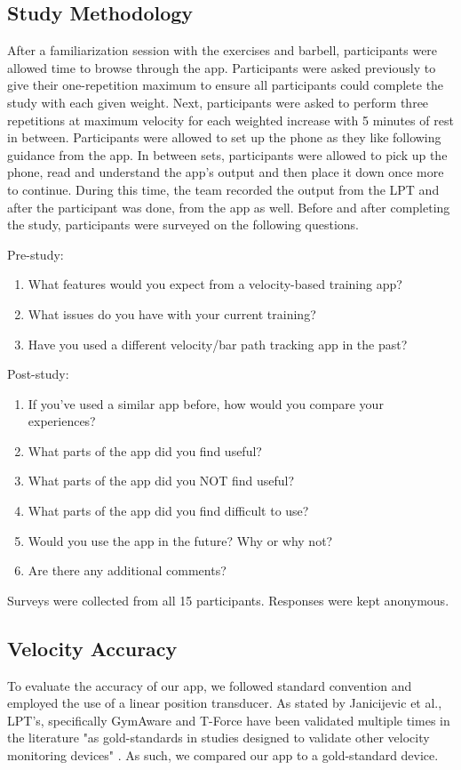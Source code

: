 \documentclass[10pt,twocolumn]{article}
\begin{document}
\subsection{Study Methodology}
After a familiarization session with the exercises and barbell, participants were allowed time to browse through the app.
Participants were asked previously to give their one-repetition maximum to ensure all participants could complete the study with each given weight.
Next, participants were asked to perform three repetitions at maximum velocity for each weighted increase with 5 minutes of rest in between.
Participants were allowed to set up the phone as they like following guidance from the app.
In between sets, participants were allowed to pick up the phone, read and understand the app's output and then place it down once more to continue.
During this time, the team recorded the output from the LPT and after the participant was done, from the app as well.
Before and after completing the study, participants were surveyed on the following questions. \par
Pre-study:
\begin{enumerate}
  \item What features would you expect from a velocity-based training app?
  \item What issues do you have with your current training?
  \item Have you used a different velocity/bar path tracking app in the past?
\end{enumerate}
Post-study:
\begin{enumerate}
  \item If you've used a similar app before, how would you compare your experiences?
  \item What parts of the app did you find useful?
  \item What parts of the app did you NOT find useful?
  \item What parts of the app did you find difficult to use?
  \item Would you use the app in the future? Why or why not?
  \item Are there any additional comments?
\end{enumerate}
Surveys were collected from all 15 participants.
Responses were kept anonymous.

\subsection{Velocity Accuracy}
To evaluate the accuracy of our app, we followed standard convention and employed the use of a linear position transducer.
As stated by Janicijevic et al., LPT's, specifically GymAware and T-Force have been validated multiple times in the literature "as gold-standards in studies designed to validate other velocity monitoring devices" \cite{Janicijevic2021}.
As such, we compared our app to a gold-standard device. \par
\end{document}
